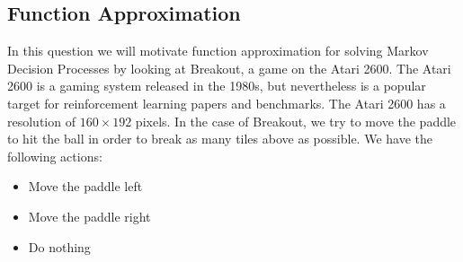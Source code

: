 \documentclass[11pt,addpoints,answers]{exam}
\begin{document}
\clearpage

\subsection{Function Approximation}
\label{sec:FA}

In this question we will motivate function approximation for solving Markov Decision Processes by looking at Breakout, a game on the Atari 2600. The Atari 2600 is a gaming system released in the 1980s, but nevertheless is a popular target for reinforcement learning papers and benchmarks. The Atari 2600 has a resolution of $160 \times 192$ pixels. In the case of Breakout, we try to move the paddle to hit the ball in order to break as many tiles above as possible. We have the following actions:
\begin{itemize}
    \item Move the paddle left
    \item Move the paddle right
    \item Do nothing
\end{itemize}
\end{document}
